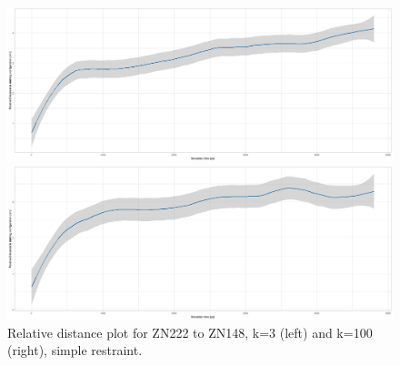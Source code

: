 \documentclass[oneside]{scrreprt}
\begin{document}
\begin{figure}[h]
    
    

\begin{minipage}{0.5\textwidth}
\includegraphics[width=1\textwidth]{plots/reldistplot_zn222_k3simple.png}
\end{minipage}
\begin{minipage}{0.5\textwidth}
\includegraphics[width=1\textwidth]{plots/reldistplot_zn222_k100simple.png}
\end{minipage}


\caption[Relative distance plot: ZN222 to ZN148, k=3 and k=100 (simple)]{Relative distance plot for ZN222 to ZN148, k=3 (left) and k=100 (right), simple restraint.}\label{fig:reldist_zn222simple}
\end{figure}
\end{document}
